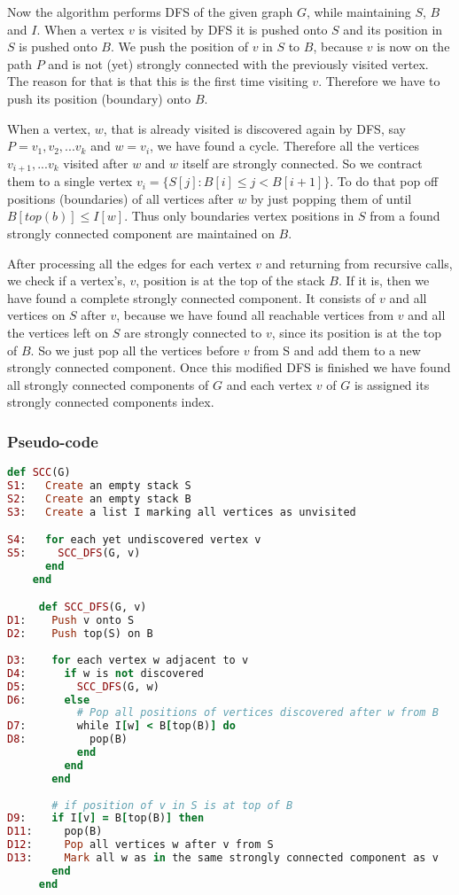 \documentclass{report}
\theoremstyle{plain}
\theoremstyle{definition}
\theoremstyle{remark}
\numberwithin{definition}{chapter}
\numberwithin{example}{chapter}
\numberwithin{figure}{chapter}
\numberwithin{theorem}{chapter}
\numberwithin{lemma}{chapter}
\begin{document}
Now the algorithm performs DFS of the given graph $G$, while maintaining $S$, $B$ and $I$. When a vertex $v$ is visited by DFS it is pushed onto $S$ and its position in $S$ is pushed onto $B$. We push the position of $v$ in $S$ to $B$, because $v$ is now on the path $P$ and is not (yet) strongly connected with the previously visited vertex. The reason for that is that this is the first time visiting $v$. Therefore we have to push its position (boundary) onto $B$.

When a vertex, $w$, that is already visited is discovered again by DFS, say $P=v_1,v_2,...v_k$ and $w=v_i$, we have found a cycle. Therefore all the vertices $v_{i+1},...v_k$ visited after $w$ and $w$ itself are strongly connected. So we contract them to a single vertex $v_i=\{ S[j] : B[i] \leq j < B[i+1] \}$. To do that pop off positions (boundaries) of all vertices after $w$ by just popping them of until $B[top(b)] \leq I[w]$. Thus only boundaries vertex positions in $S$ from a found strongly connected component are maintained on $B$.

After processing all the edges for each vertex $v$ and returning from recursive calls, we check if a vertex's, $v$, position is at the top of the stack $B$. If it is, then we have found a complete strongly connected component. It consists of $v$ and all vertices on $S$ after $v$, because we have found all reachable vertices from $v$ and all the vertices left on $S$ are strongly connected to $v$, since its position is at the top of $B$. So we just pop all the vertices before $v$ from S and add them to a new strongly connected component. Once this modified DFS is finished we have found all strongly connected components of $G$ and each vertex $v$ of $G$ is assigned its strongly connected components index.

\subsubsection*{Pseudo-code}

\begin{lstlisting}[language=Ruby]
    def SCC(G)
S1:   Create an empty stack S
S2:   Create an empty stack B
S3:   Create a list I marking all vertices as unvisited

S4:   for each yet undiscovered vertex v
S5:     SCC_DFS(G, v)
      end
    end

     def SCC_DFS(G, v)  
D1:    Push v onto S
D2:    Push top(S) on B
  
D3:    for each vertex w adjacent to v
D4:      if w is not discovered
D5:        SCC_DFS(G, w)
D6:      else
           # Pop all positions of vertices discovered after w from B
D7:        while I[w] < B[top(B)] do
D8:          pop(B)
           end
         end
       end
  
       # if position of v in S is at top of B
D9:    if I[v] = B[top(B)] then
D11:     pop(B)
D12:     Pop all vertices w after v from S
D13:     Mark all w as in the same strongly connected component as v
       end
     end
\end{lstlisting}
\end{document}
